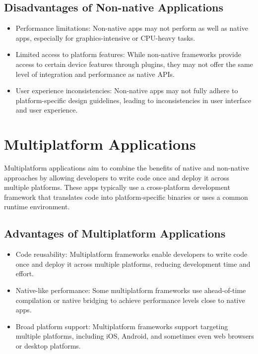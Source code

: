 \documentclass[journal,comsoc]{IEEEtran}
\begin{document}
	\subsection{Disadvantages of Non-native Applications}
	\begin{itemize}
		\item Performance limitations: Non-native apps may not perform as well as native apps, especially for graphics-intensive or CPU-heavy tasks.
		\item Limited access to platform features: While non-native frameworks provide access to certain device features through plugins, they may not offer the same level of integration and performance as native APIs.
		\item User experience inconsistencies: Non-native apps may not fully adhere to platform-specific design guidelines, leading to inconsistencies in user interface and user experience.
	\end{itemize}
	
	\section{Multiplatform Applications}
	Multiplatform applications aim to combine the benefits of native and non-native approaches by allowing developers to write code once and deploy it across multiple platforms. These apps typically use a cross-platform development framework that translates code into platform-specific binaries or uses a common runtime environment.
	
	\subsection{Advantages of Multiplatform Applications}
	\begin{itemize}
		\item Code reusability: Multiplatform frameworks enable developers to write code once and deploy it across multiple platforms, reducing development time and effort.
		\item Native-like performance: Some multiplatform frameworks use ahead-of-time compilation or native bridging to achieve performance levels close to native apps.
		\item Broad platform support: Multiplatform frameworks support targeting multiple platforms, including iOS, Android, and sometimes even web browsers or desktop platforms.
	\end{itemize}
	
\end{document}

